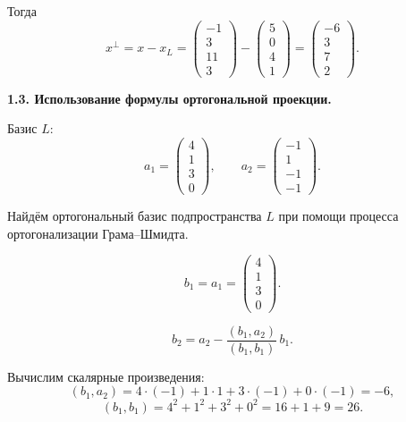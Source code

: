 Тогда
\[
x^\perp=x-x_L=
\begin{pmatrix}
-1\\
3\\
11\\
3
\end{pmatrix}
-
\begin{pmatrix}
5\\
0\\
4\\
1
\end{pmatrix}
=
\begin{pmatrix}
-6\\
3\\
7\\
2
\end{pmatrix}.
\]

\bigskip

\textbf{1.3. Использование формулы ортогональной проекции.}

Базис $L$:
\[
a_1=
\begin{pmatrix}
4\\
1\\
3\\
0
\end{pmatrix},
\qquad
a_2=
\begin{pmatrix}
-1\\
1\\
-1\\
-1
\end{pmatrix}.
\]

Найдём ортогональный базис подпространства $L$ при помощи процесса ортогонализации Грама--Шмидта.

\[
b_1=a_1=
\begin{pmatrix}
4\\
1\\
3\\
0
\end{pmatrix}.
\]

\[
b_2=a_2-\frac{(b_1,a_2)}{(b_1,b_1)}\,b_1.
\]

Вычислим скалярные произведения:
\[
(b_1,a_2)=4\cdot(-1)+1\cdot1+3\cdot(-1)+0\cdot(-1)=-6,
\]
\[
(b_1,b_1)=4^2+1^2+3^2+0^2=16+1+9=26.
\]

